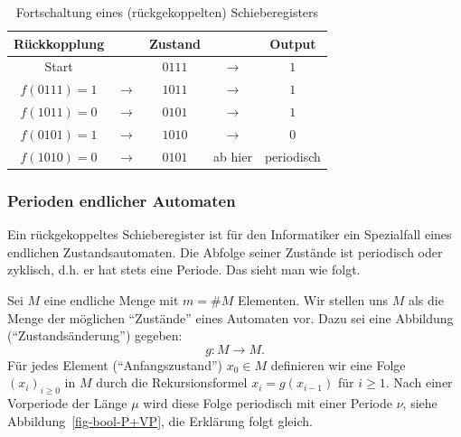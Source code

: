 \begin{refsegment}
\begin{table}
\begin{center}
\begin{tabular}{|cc|c|cc|} \hline
   Rückkopplung  &                   & Zustand &                   & Output \\ \hline
   Start         &                   & $0111$  & $\longrightarrow$ & $1$    \\
   $f(0111) = 1$ & $\longrightarrow$ & $1011$  & $\longrightarrow$ & $1$    \\
   $f(1011) = 0$ & $\longrightarrow$ & $0101$  & $\longrightarrow$ & $1$    \\
   $f(0101) = 1$ & $\longrightarrow$ & $1010$  & $\longrightarrow$ & $0$    \\
   $f(1010) = 0$ & $\longrightarrow$ & $0101$  & ab hier           & periodisch \\
   \hline
\end{tabular}
\end{center}
\caption{Fortschaltung eines (rückgekoppelten) Schieberegisters}\label{tab-bool-fsr2}
\end{table}


\subsubsection*{Perioden endlicher Automaten}%

Ein rückgekoppeltes Schieberegister ist für den Informatiker ein Spezialfall eines
endlichen Zustandsautomaten.
Die Abfolge seiner Zustände ist periodisch oder zyklisch, d.h. er hat stets eine
Periode. Das sieht man wie folgt.

Sei $M$ eine endliche Menge mit $m = \#M$ Elementen. Wir stellen uns $M$
als die Menge der möglichen "`Zustände"' eines Automaten vor. Dazu sei eine
Abbildung ("`Zustandsänderung"') gegeben:
\[
    g\!: M \longrightarrow M.
\]
Für jedes Element ("`Anfangszustand"') $x_0 \in M$ definieren wir eine Folge
$(x_i)_{i \geq 0}$ in $M$ durch die Rekursionsformel $x_i = g(x_{i-1})$
für $i \geq 1$. Nach einer Vorperiode der Länge $\mu$ wird diese Folge
periodisch mit einer Periode $\nu$, siehe Abbildung~\ref{fig-bool-P+VP},
die Erklärung folgt gleich.


\end{refsegment}
